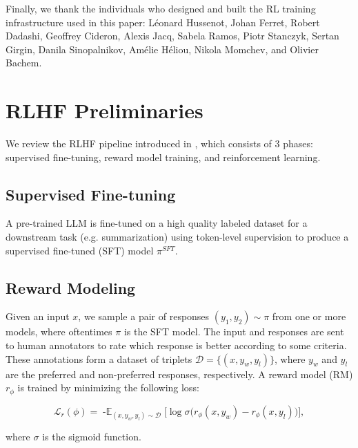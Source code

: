 \documentclass[11pt]{article}
\begin{document}
Finally, we thank the individuals who designed and built the RL training infrastructure used in this paper: Léonard Hussenot, Johan Ferret, Robert Dadashi, Geoffrey Cideron, Alexis Jacq, Sabela Ramos, Piotr Stanczyk, Sertan Girgin, Danila Sinopalnikov, Amélie Héliou, Nikola Momchev, and Olivier Bachem.



\clearpage
\appendix

\section{RLHF Preliminaries}
\label{sec:preliminaries}

We review the RLHF pipeline introduced in \citet{stiennon2020learning,ouyang2022training}, which consists of 3 phases: supervised fine-tuning, reward model training, and reinforcement learning.

\subsection{Supervised Fine-tuning}

A pre-trained LLM is fine-tuned on a high quality labeled dataset for a downstream task (e.g. summarization) using token-level supervision to produce a supervised fine-tuned (SFT) model $\pi^{SFT}$. 

\subsection{Reward Modeling}
\label{sec:prelim_reward_modeling}
Given an input $x$, we sample a pair of responses $(y_1, y_2) \sim \pi$ from one or more models, where oftentimes $\pi$ is the SFT model. The input and responses are sent to human annotators to rate which response is better according to some criteria. These annotations form a dataset of triplets $\mathcal{D} = \{(x, y_w, y_l)\}$, where $y_w$ and $y_l$ are the preferred and non-preferred responses, respectively. A reward model (RM) $r_{\phi}$ is trained by minimizing the following loss:

\begin{small}
\[
\mathcal{L}_r (\phi)
= \mathop{-\mathbb{E}}_{(x, y_w, y_l) \sim \mathcal{D} }
 \Big[\log \sigma \big(
                r_{\phi} (x, y_w) -
                r_{\phi} (x, y_l) 
        \big)
 \Big],\]
\end{small}

\noindent where $\sigma$ is the sigmoid function.
\end{document}
